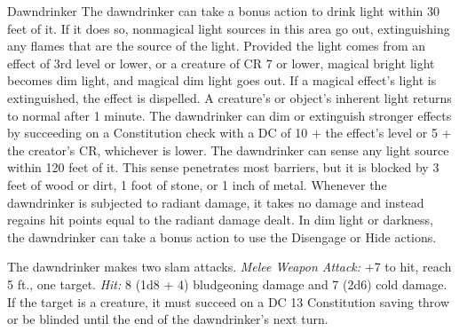 \documentclass[10pt,a4paper,twoside,twocolumn,openany,bg=print,nodeprecatedcode]{dndbook}
\begin{document}
\begin{DndMonster}[float*=t]{Dawndrinker}
\DndMonsterBasics[
armor-class = {15 (natural armor)},
hit-points = {\DndDice{12d10 + 48}},
speed = {40 ft.}
]
\DndMonsterAbilityScores[
 str = 18,
 dex = 14,
 con = 19,
 int = 3,
 wis = 11,
 cha = 7
]
\DndMonsterDetails[
skills = {Stealth +5},
damage-resistances = {fire},
damage-immunities = {radiant},
senses = {blindsight 120 ft., darkvision 240 ft., passive perception 10},
challenge = 5,
]
The dawndrinker can take a bonus action to drink light within 30 feet of it. If it does so, nonmagical light sources in this area go out, extinguishing any flames that are the source of the light. Provided the light comes from an effect of 3rd level or lower, or a creature of CR 7 or lower, magical bright light becomes dim light, and magical dim light goes out. If a magical effect's light is extinguished, the effect is dispelled. A creature's or object's inherent light returns to normal after 1 minute. The dawndrinker can dim or extinguish stronger effects by succeeding on a Constitution check with a DC of 10 + the effect's level or 5 + the creator's CR, whichever is lower.
The dawndrinker can sense any light source within 120 feet of it. This sense penetrates most barriers, but it is blocked by 3 feet of wood or dirt, 1 foot of stone, or 1 inch of metal.
Whenever the dawndrinker is subjected to radiant damage, it takes no damage and instead regains hit points equal to the radiant damage dealt.
In dim light or darkness, the dawndrinker can take a bonus action to use the Disengage or Hide actions.
\par
{}
The dawndrinker makes two slam attacks.
\textsl{Melee Weapon Attack:} +7 to hit, reach 5 ft., one target. \textsl{Hit:} 8 (1d8 + 4) bludgeoning damage and 7 (2d6) cold damage. If the target is a creature, it must succeed on a DC 13 Constitution saving throw or be blinded until the end of the dawndrinker's next turn.
\end{DndMonster}
\end{document}
